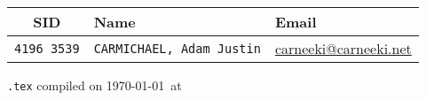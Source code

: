 \begin{titlingpage}
\thispagestyle{empty}

\begin{center}
\textsc{\LARGE \MyInstitution }\\[1.5cm]
\HRule \\[0.9cm]

{ \huge \bfseries \MyTitle }\\[0.4cm] \HRule \\
{ \small{\MySubtitle} }

\vfill

\begin{tabularx}{\linewidth}{ c X X}
\hline
  SID & Name & Email \\
  \hline
  \texttt{4196 3539} & \texttt{CARMICHAEL, Adam Justin}  & \url{carneeki@carneeki.net}
\end{tabularx}

\vspace{1cm}
\small{
  \texttt{\jobname.tex} compiled on
  \today ~at \currenttime
}
\end{center}  

\end{titlingpage}